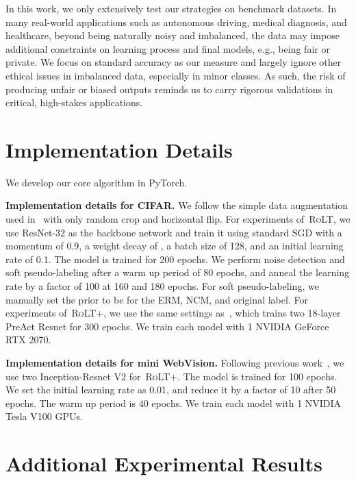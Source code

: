 \documentclass{article}
\def\algo{{\textsc{RoLT}}}
\begin{document}
In this work, we only extensively test our strategies on benchmark datasets. In many
real-world applications such as autonomous driving, medical diagnosis, and healthcare, beyond
being naturally noisy and imbalanced, the data may impose additional constraints on learning process and final
models, e.g., being fair or private. We focus on standard accuracy as our measure and largely ignore
other ethical issues in imbalanced data, especially in minor classes. As such, the risk of producing
unfair or biased outputs reminds us to carry rigorous validations in critical, high-stakes applications.




\newpage
\appendix

\section{Implementation Details}
We develop our core algorithm in PyTorch.

\textbf{Implementation details for CIFAR.} We follow the simple data augmentation used in~\cite{he2016deep} with only random crop and horizontal flip. For experiments of~\algo, we use ResNet-32 as the backbone network and train it using standard SGD with a momentum of 0.9, a weight decay of , a batch size of 128, and an initial learning rate of 0.1. The model is trained for 200 epochs. We perform noise detection and soft pseudo-labeling after a warm up period of 80 epochs, and anneal the learning rate by a factor of 100 at 160 and 180 epochs. For soft pseudo-labeling, we manually set the prior  to be  for the ERM, NCM, and original label. For experiments of~\algo+, we use the same settings as~\cite{li2020dividemix}, which trains two 18-layer PreAct Resnet for 300 epochs. We train each model with 1 NVIDIA GeForce RTX 2070.


\textbf{Implementation details for mini WebVision.} Following previous work~\cite{li2020dividemix}, we use two Inception-Resnet V2 for~\algo+. The model is trained for 100 epochs. We set the initial learning rate as 0.01, and reduce it by a factor of 10 after 50 epochs. The warm up period is 40 epochs. We train each model with 1 NVIDIA Tesla V100 GPUs.

\section{Additional Experimental Results}
\end{document}
